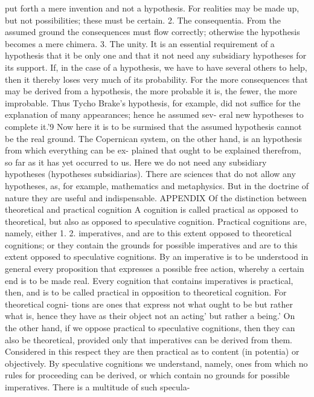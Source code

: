 put forth a mere invention and not a hypothesis. For realities may be made
up, but not possibilities; these must be certain.
2. The consequentia. From the assumed ground the consequences
must flow correctly; otherwise the hypothesis becomes a mere chimera.
3. The unity. It is an essential requirement of a hypothesis that it be
only one and that it not need any subsidiary hypotheses for its support. If,
in the case of a hypothesis, we have to have several others to help, then it
thereby loses very much of its probability. For the more consequences that
may be derived from a hypothesis, the more probable it is, the fewer, the
more improbable. Thus Tycho Brake's hypothesis, for example, did not
suffice for the explanation of many appearances; hence he assumed sev-
eral new hypotheses to complete it.'9 Now here it is to be surmised that the
assumed hypothesis cannot be the real ground. The Copernican system,
on the other hand, is an hypothesis from which everything can be ex-
plained that ought to be explained therefrom, so far as it has yet occurred to
us. Here we do not need any subsidiary hypotheses (hypotheses subsidiarias).
There are sciences that do not allow any hypotheses, as, for example,
mathematics and metaphysics. But in the doctrine of nature they are
useful and indispensable.
APPENDIX
Of the distinction between theoretical and practical cognition
A cognition is called practical as opposed to theoretical, but also as opposed
to speculative cognition.
Practical cognitions are, namely, either
1.
2.
imperatives, and are to this extent opposed to theoretical cognitions; or they
contain
the grounds for possible imperatives and are to this extent opposed to speculative
cognitions.
By an imperative is to be understood in general every proposition that
expresses a possible free action, whereby a certain end is to be made real.
Every cognition that contains imperatives is practical, then, and is to be
called practical in opposition to theoretical cognition. For theoretical cogni-
tions are ones that express not what ought to be but rather what is, hence
they have as their object not an acting' but rather a being.'
On the other hand, if we oppose practical to speculative cognitions, then
they can also be theoretical, provided only that imperatives can be derived from
them. Considered in this respect they are then practical as to content (in
potentia) or objectively. By speculative cognitions we understand, namely,
ones from which no rules for proceeding can be derived, or which contain
no grounds for possible imperatives. There is a multitude of such specula-
